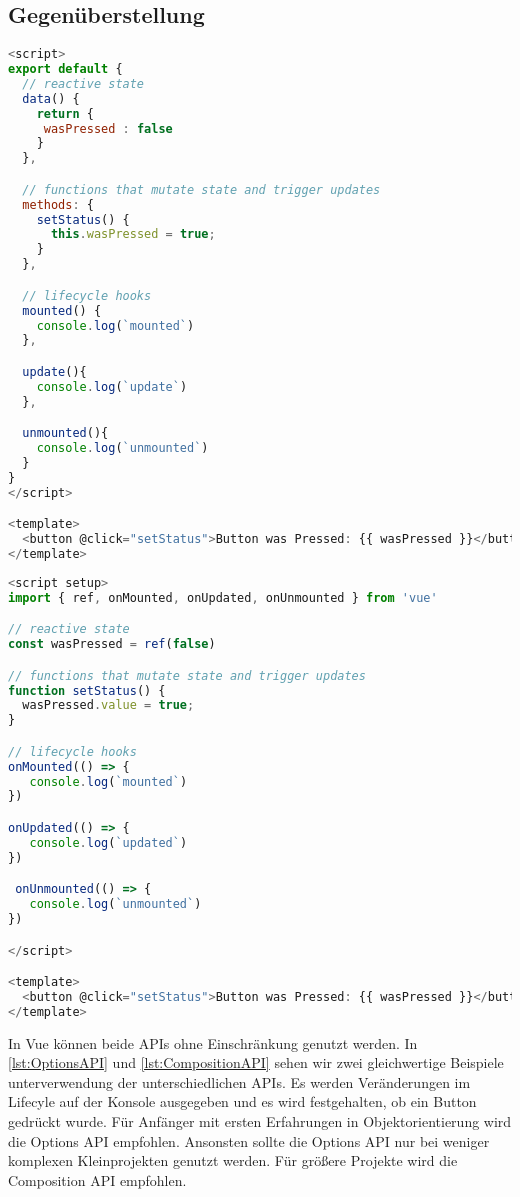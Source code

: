 \subsection*{Gegenüberstellung}

\begin{minipage}[t]{.45\textwidth}
    \begin{lstlisting}[caption={Options API},language=javascript, label={lst:OptionsAPI}]
<script>
export default {
  // reactive state
  data() {
    return {
     wasPressed : false
    }
  },

  // functions that mutate state and trigger updates
  methods: {
    setStatus() {
      this.wasPressed = true;
    }
  },

  // lifecycle hooks
  mounted() {
    console.log(`mounted`)
  },

  update(){
    console.log(`update`)
  },

  unmounted(){
    console.log(`unmounted`)
  }
}
</script>

<template>
  <button @click="setStatus">Button was Pressed: {{ wasPressed }}</button>
</template>
    \end{lstlisting}
\end{minipage}%
\hspace{1cm}
\begin{minipage}[t]{.5\textwidth}
    \begin{lstlisting}[caption={Composition API},language=javascript, label={lst:CompositionAPI}]
<script setup>
import { ref, onMounted, onUpdated, onUnmounted } from 'vue'

// reactive state
const wasPressed = ref(false)

// functions that mutate state and trigger updates
function setStatus() {
  wasPressed.value = true;
}

// lifecycle hooks
onMounted(() => {
   console.log(`mounted`)
})

onUpdated(() => {
   console.log(`updated`)
})

 onUnmounted(() => {
   console.log(`unmounted`)
})

</script>

<template>
  <button @click="setStatus">Button was Pressed: {{ wasPressed }}</button>
</template>
    \end{lstlisting}
\end{minipage}

In Vue können beide APIs ohne Einschränkung genutzt werden.
In \ref{lst:OptionsAPI} und \ref{lst:CompositionAPI} sehen wir zwei gleichwertige
Beispiele unterverwendung der unterschiedlichen APIs.
Es werden Veränderungen im Lifecyle auf der Konsole ausgegeben und es wird festgehalten, ob ein Button gedrückt wurde.
Für Anfänger mit ersten Erfahrungen in Objektorientierung wird die Options API empfohlen.
Ansonsten sollte die Options API nur bei weniger komplexen Kleinprojekten genutzt werden.
Für größere Projekte wird die Composition API empfohlen. \cite{vueIntroduction}

